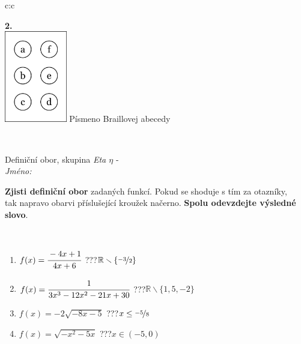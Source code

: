 \documentclass[10pt]{report}
\begin{document}
\begin{tabular}{c:c}
\begin{minipage}[c][104.5mm][t]{0.5\linewidth}
\begin{center}
\begin{minipage}{0.20\linewidth}
\begin{center}
{\Huge\bfseries 2.} \\[2mm]
\includegraphics[height=40mm]{../images/braille.png}
{\small Písmeno Braillovej abecedy}
\end{center}
\end{minipage}
\end{center}
\end{minipage}
\\ \hdashline
\begin{minipage}[c][104.5mm][t]{0.5\linewidth}
\begin{center}
\vspace{7mm}
{\huge Definiční obor, skupina \textit{Eta $\eta$} -}\\[5mm]
\textit{Jméno:}\phantom{xxxxxxxxxxxxxxxxxxxxxxxxxxxxxxxxxxxxxxxxxxxxxxxxxxxxxxxxxxxxxxxxx}\\[5mm]
\begin{minipage}{0.95\linewidth}
\begin{center}
\textbf{Zjisti definiční obor} zadaných funkcí. Pokud se shoduje s tím za otazníky,\\tak napravo obarvi příslušející kroužek načerno. \textbf{Spolu odevzdejte výsledné slovo}.
\end{center}
\end{minipage}
\\[1mm]
\begin{minipage}{0.79\linewidth}
\begin{center}
\begin{varwidth}{\linewidth}
\begin{enumerate}
\normalsizerrr
\item $f(x)=\cfrac{-4x+1}{4x+6}$\quad \dotfill\; ???\;\dotfill \quad $\mathbb{R}\smallsetminus\{\nicefrac{-3}{2}\}$
\item $f(x)=\cfrac{1}{3x^3-12x^2-21x+30}$\quad \dotfill\; ???\;\dotfill \quad $\mathbb{R}\smallsetminus\{1,5,-2\}$
\item $f(x)=-2\sqrt{-8x-5}$\quad \dotfill\; ???\;\dotfill \quad $x\leq\nicefrac{-5}{8}$
\item $f(x)=\sqrt{-x^2-5x}$\quad \dotfill\; ???\;\dotfill \quad $x\in(-5 , 0)$

\end{enumerate}
\end{varwidth}
\end{center}
\end{minipage}
\end{center}
\end{minipage}
\end{tabular}
\end{document}
